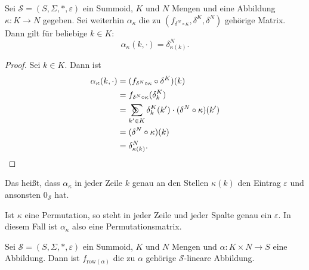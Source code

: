 \documentclass{article}
\DeclareMathOperator*{\sumcirc}{%
  \ThisStyle{\mathop{\ensurestackMath{\stackinset{c}{-1.5\LMpt}{c}{}{%
  \rotatebox[origin=lb]{-90}{$\SavedStyle\scalerel*{\bm\Circle}{%
  i}$}}{\SavedStyle\sum}}}}}
\begin{document}
\begin{theorem}
  Sei $\mathcal{S} = (S, \Sigma, \ast, \varepsilon)$ ein Summoid,
  $K$ und $N$ Mengen und eine Abbildung $\kappa \colon K \to N$ gegeben.
  Sei weiterhin $\alpha_\kappa$ die zu $(f_{\delta^N \circ \kappa}, \delta^K, \delta^N)$
  gehörige Matrix.
  Dann gilt für beliebige $k \in K$:
  \begin{equation*}
    \alpha_\kappa(k, \cdot) = \delta^N_{\kappa(k)}.
  \end{equation*}
\end{theorem}
\begin{proof}
  Sei $k \in K$. Dann ist
  \begin{align*}
    \alpha_\kappa(k, \cdot)
    &= (f_{\delta^N \circ \kappa} \circ \delta^K)(k) \\
    &= f_{\delta^N \circ \kappa}(\delta^K_k) \\
    &= \sumcirc_{k' \in K}\delta^K_k(k') \cdot (\delta^N \circ \kappa)(k') \\
    &= (\delta^N \circ \kappa)(k) \\
    &= \delta^N_{\kappa(k)}.
  \end{align*}
\end{proof}

\begin{remark}
  Das heißt, dass $\alpha_\kappa$ in jeder Zeile $k$ genau an den Stellen $\kappa(k)$
  den Eintrag $\varepsilon$ und ansonsten $0_\mathcal{S}$ hat.

  Ist $\kappa$ eine Permutation, so steht in jeder Zeile und jeder Spalte genau ein $\varepsilon$.
  In diesem Fall ist $\alpha_\kappa$ also eine Permutationsmatrix.
\end{remark}

\begin{definition}
  Sei $\mathcal{S} = (S, \Sigma, \ast, \varepsilon)$ ein Summoid, $K$ und $N$ Mengen und
  $\alpha \colon K \times N \to S$ eine Abbildung.
  Dann ist $f_{\text{row}(\alpha)}$ die zu $\alpha$ gehörige $\mathcal{S}$-lineare Abbildung.
\end{definition}
\end{document}
